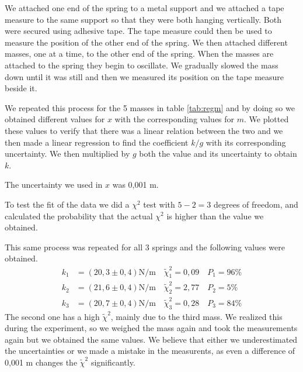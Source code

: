 \documentclass{article}
\begin{document}
We attached one end of the spring to a metal support and we attached a tape measure to the same support so that they were both hanging vertically. Both were secured using adhesive tape. The tape measure could then be used to measure the position of the other end of the spring. We then attached different masses, one at a time, to the other end of the spring. When the masses are attached to the spring they begin to oscillate. We gradually slowed the mass down until it was still and then we measured its position on the tape measure beside it. 

We repeated this process for the 5 masses in table \ref{tab:regm} and by doing so we obtained different values for $x$ with the
corresponding values for $m$. We plotted these values to verify that
there was a linear relation between the two and we then made a linear
regression to find the coefficient $k/g$ with its corresponding
uncertainty. We then multiplied by $g$ both the value and its uncertainty to obtain $k$. 

The uncertainty we used in $x$ was 0,001 m.

To test the fit of the data we did a $\chi^2$ test with $5-2 = 3$ degrees of freedom, and calculated the probability that the actual $\chi^2$ is higher than the value we obtained.

This same process was repeated for all 3 springs and the following values were obtained.
\begin{align}
    k_1 &= (20,3 \pm 0,4) \text{N/m} \quad \tilde \chi_1^2 = 0,09 \quad P_1 = 96\% \\
    k_2 &= (21,6 \pm 0,4) \text{N/m} \quad \tilde \chi_2^2 = 2,77 \quad P_2 =  5\% \\
    k_3 &= (20,7 \pm 0,4) \text{N/m} \quad \tilde \chi_3^2 = 0,28 \quad P_3 = 84\%
\end{align}
The second one has a high $\tilde \chi^2$, mainly due to the third mass. We realized this during the experiment, so we weighed the mass again and took the measurements again but we obtained the same values. We believe that either we underestimated the uncertainties or we made a mistake in the measurents, as even a difference of 0,001 m changes the $\tilde \chi^2$ significantly.
\end{document}
